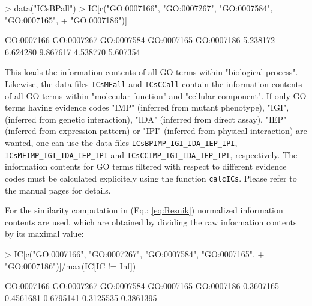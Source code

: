 \documentclass[12pt,a4paper]{article}
\begin{document}
\begin{Schunk}
\begin{Sinput}
> data("ICsBPall")
> IC[c("GO:0007166", "GO:0007267", "GO:0007584", "GO:0007165", 
+     "GO:0007186")]
\end{Sinput}
\begin{Soutput}
GO:0007166 GO:0007267 GO:0007584 GO:0007165 GO:0007186 
  5.238172   6.624280   9.867617   4.538770   5.607354 
\end{Soutput}
\end{Schunk}
This loads the information contents of all GO terms within "biological process". Likewise, the data files {\tt ICsMFall} and {\tt ICsCCall} contain the information contents of all GO terms within "molecular function" and "cellular component". If only GO terms having evidence codes "IMP" (inferred from mutant phenotype), "IGI", (inferred from genetic interaction), "IDA" (inferred from direct assay), "IEP" (inferred from expression pattern) or "IPI" (inferred from physical interaction) are wanted, one can use the data files {\tt ICsBPIMP\_IGI\_IDA\_IEP\_IPI}, {\tt ICsMFIMP\_IGI\_IDA\_IEP\_IPI} and {\tt ICsCCIMP\_IGI\_IDA\_IEP\_IPI}, respectively. The information contents for GO terms filtered with respect to different evidence codes must be calculated explicitely using the function {\tt calcICs}. Please refer to the manual pages for details.

For the similarity computation in (Eq.: \ref{eq:Resnik}) normalized information contents are used, which are obtained by dividing the raw information contents by its maximal value:
\begin{Schunk}
\begin{Sinput}
> IC[c("GO:0007166", "GO:0007267", "GO:0007584", "GO:0007165", 
+     "GO:0007186")]/max(IC[IC != Inf])
\end{Sinput}
\begin{Soutput}
GO:0007166 GO:0007267 GO:0007584 GO:0007165 GO:0007186 
 0.3607165  0.4561681  0.6795141  0.3125535  0.3861395 
\end{Soutput}
\end{Schunk}
\end{document}
